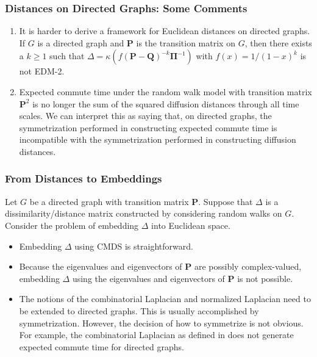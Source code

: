 \documentclass[professionalfonts, hyperref={pdfpagelabels=false,
  colorlinks=true, linkcolor=purple}]{beamer}
\begin{document}
\begin{frame}
  \frametitle{Distances on Directed Graphs: Some Comments}
  \begin{enumerate}
  \item  It is harder to derive a framework for Euclidean distances on
    directed graphs. If $G$ is a directed graph and
    $\mathbf{P}$ is the transition matrix on $G$, then there exists a
    $k \geq 1$ such that $\Delta = \kappa(f(\mathbf{P} -
    \mathbf{Q})^{-k} \bm{\Pi}^{-1})$ with $f(x) = 1/(1-x)^{k}$ is not
    EDM-2. 
  \item \vskip10pt Expected commute time under the random walk model with
    transition matrix $\mathbf{P}^{2}$ is no longer the sum of the
    squared diffusion distances through all time scales. We can
    interpret this as saying that, on directed graphs, the
    symmetrization performed in constructing expected commute time is
    incompatible with the symmetrization performed in constructing
    diffusion distances.
  \end{enumerate}
\end{frame}

\begin{frame}
  \frametitle{From Distances to Embeddings}
  Let $G$ be a directed graph with transition matrix
  $\mathbf{P}$. Suppose that $\Delta$ is a dissimilarity/distance
  matrix constructed by considering random walks on $G$. Consider the
  problem of embedding $\Delta$ into Euclidean space.
  \vskip10pt
  \begin{itemize}
  \item Embedding $\Delta$ using CMDS is straightforward.
  \item Because the eigenvalues and
    eigenvectors of $\mathbf{P}$ are possibly complex-valued,
    embedding $\Delta$ using the eigenvalues and eigenvectors of
    $\mathbf{P}$ is not possible. 
  \item The notions of the combinatorial Laplacian and normalized
    Laplacian need to be extended to directed graphs. This is usually
    accomplished by symmetrization. However, the decision of how to
    symmetrize is not obvious. For example, the combinatorial
    Laplacian as defined in \cite{chung05:_laplac_cheeg} does not generate
    expected commute time for directed graphs.
  \end{itemize}
\end{frame}

\end{document}
